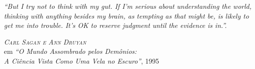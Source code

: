 
\begin{epigrafe} %

\hypertarget{estilo:epigrafe}{} %

\textit{\large``But I try not to think with my gut. If I'm serious about understanding the world, thinking with anything besides my brain, as tempting as that might be, is likely to get me into trouble. It's OK to reserve judgment until the evidence is in.''.}

\vspace{1cm}

\hspace{4cm} \emph{\textsc{Carl Sagan e Ann Druyan}}\\
\hspace{4cm} em \textsl{``O Mundo Assombrado pelos Demônios:}\\
\hspace{4cm} \textsl{A Ciência Vista Como Uma Vela no Escuro''}, 1995

\end{epigrafe}

